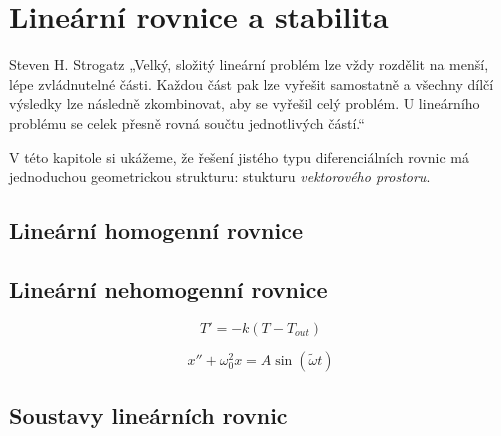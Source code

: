 \chapter{Lineární rovnice a stabilita}
\begin{chapquote}{Steven H. Strogatz}%
 „Velký, složitý lineární problém lze vždy rozdělit na menší, lépe zvládnutelné části. Každou část pak lze vyřešit samostatně a všechny dílčí výsledky lze následně zkombinovat, aby se vyřešil celý problém. U lineárního problému se celek přesně rovná součtu jednotlivých částí.“
\end{chapquote}
V této kapitole si ukážeme, že řešení jistého typu diferenciálních rovnic má jednoduchou geometrickou strukturu: stukturu \emph{vektorového prostoru}.
\section{Lineární homogenní rovnice}
\section{Lineární nehomogenní rovnice}
\begin{příklad}
\begin{equation*}
	T'=-k(T-T_{out})
\end{equation*}
\end{příklad}
\begin{příklad}[Rezonance]
\begin{equation*}
  x''+\omega_0^{2}x=A\sin(\tilde{\omega}t)
\end{equation*}
\end{příklad}
\section{Soustavy lineárních rovnic}
